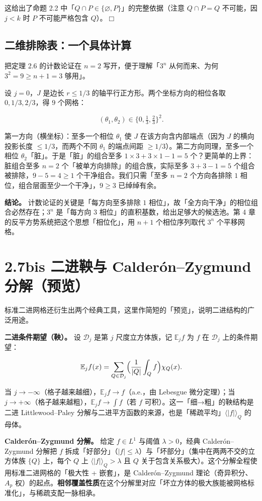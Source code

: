 \documentclass[a4paper,11pt,openany]{ctexbook}
\numberwithin{equation}{chapter}
\numberwithin{figure}{chapter}
\numberwithin{table}{chapter}
\begin{document}
这给出了命题 2.2 中「$Q\cap P\in\{\varnothing,P\}$」的完整依据（注意 $Q\cap P=Q$ 不可能，因 $j<k$ 时 $P$ 不可能严格包含 $Q$）。$\Box$

\subsection{二维排除表：一个具体计算}

把定理 2.6 的计数论证在 $n=2$ 写开，便于理解「$3^n$ 从何而来、为何 $3^2=9\ge n+1=3$ 够用」。

设 $j=0$，$J$ 是边长 $r\le 1/3$ 的轴平行正方形。两个坐标方向的相位各取 $0,1/3,2/3$，得 $9$ 个网格：

$$(\theta_1,\theta_2)\in\{0,\tfrac13,\tfrac23\}^2.$$

第一方向（横坐标）：至多一个相位 $\theta_1$ 使 $J$ 在该方向含内部端点（因为 $J$ 的横向投影长度 $\le1/3$，而两个不同 $\theta_1$ 的端点间距 $\ge1/3$）。第二方向同理，至多一个相位 $\theta_2$「脏」。于是「脏」的组合至多 $1\times 3 + 3\times 1 - 1 = 5$ 个？更简单的上界：脏组合至多 $n=2$ 个「被单方向排除」的组合族，实际至多 $3+3-1=5$ 个组合被排除，$9-5=4\ge1$ 个干净组合。我们只需「至多 $n=2$ 个方向各排除 $1$ 相位，组合层面至少一个干净」，$9\ge 3$ 已绰绰有余。

\textbf{结论。} 计数论证的关键是「每方向至多排除 $1$ 相位」，故「全方向干净」的相位组合必然存在；$3^n$ 是「每方向 $3$ 相位」的直积基数，给出足够大的候选池。第 4 章的反平方势系统把这个思想「相位化」，用 $n+1$ 个相位序列取代 $3^n$ 个平移网格。

\section{2.7bis 二进鞅与 Calderón–Zygmund 分解（预览）}

标准二进网格还衍生出两个经典工具，这里作简短的「预览」，说明二进结构的广泛用途。

\textbf{二进条件期望（鞅）。} 设 $\mathcal D_j$ 是第 $j$ 尺度立方体族，记 $\mathbb E_j f$ 为 $f$ 在 $\mathcal D_j$ 上的条件期望：

$$\mathbb E_j f(x)=\sum_{Q\in\mathcal D_j}\Bigl(\frac1{|Q|}\int_Q f\Bigr)\chi_Q(x).$$

当 $j\to-\infty$（格子越来越细），$\mathbb E_j f\to f$（a.e.，由 Lebesgue 微分定理）；当 $j\to+\infty$（格子越来越粗），$\mathbb E_j f\to \int f$（若 $f$ 可积）。这一「细→粗」的鞅结构是二进 Littlewood–Paley 分解与二进平方函数的来源，也是「稀疏平均」$\langle|f|\rangle_Q$ 的母体。

\textbf{Calderón–Zygmund 分解。} 给定 $f\in L^1$ 与阈值 $\lambda>0$，经典 Calderón–Zygmund 分解把 $f$ 拆成「好部分」（$|f|\le\lambda$）与「坏部分」（集中在两两不交的立方体族 $\{Q\}$ 上，每个 $Q$ 上 $\langle|f|\rangle_Q>\lambda$ 且 $Q$ 关于包含关系极大）。这个分解全程使用标准二进网格的「极大性 + 嵌套」，是 Calderón–Zygmund 理论（奇异积分、$A_p$ 权）的起点。\textbf{相邻覆盖性质}在这个分解里对应「坏立方体的极大族能被网格标准化」，与稀疏支配一脉相承。
\end{document}
